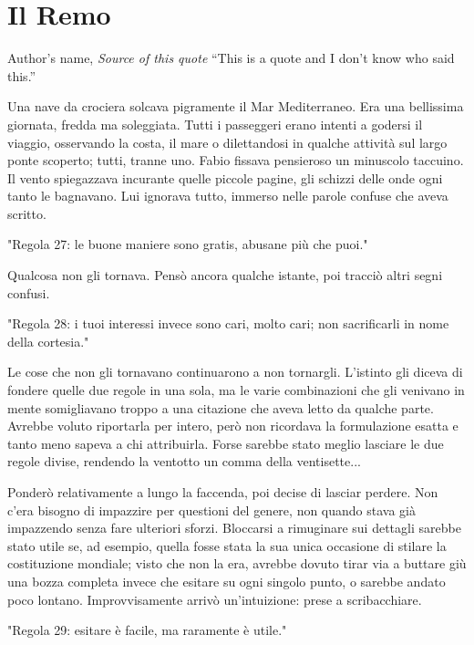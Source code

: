 \chapter{Il Remo}

\begin{chapquote}{Author's name, \textit{Source of this quote}}
``This is a quote and I don't know who said this.''
\end{chapquote}


Una nave da crociera solcava pigramente il Mar Mediterraneo. Era una bellissima giornata, fredda ma soleggiata. Tutti i passeggeri erano intenti a godersi il viaggio, osservando la costa, il mare o dilettandosi in qualche attività sul largo ponte scoperto; tutti, tranne uno. Fabio fissava pensieroso un minuscolo taccuino. Il vento spiegazzava incurante quelle piccole pagine, gli schizzi delle onde ogni tanto le bagnavano. Lui ignorava tutto, immerso nelle parole confuse che aveva scritto.

"Regola 27: le buone maniere sono gratis, abusane più che puoi."

Qualcosa non gli tornava. Pensò ancora qualche istante, poi tracciò altri segni confusi.

"Regola 28: i tuoi interessi invece sono cari, molto cari; non sacrificarli in nome della cortesia."

Le cose che non gli tornavano continuarono a non tornargli. L'istinto gli diceva di fondere quelle due regole in una sola, ma le varie combinazioni che gli venivano in mente somigliavano troppo a una citazione che aveva letto da qualche parte. Avrebbe voluto riportarla per intero, però non ricordava la formulazione esatta e tanto meno sapeva a chi attribuirla. Forse sarebbe stato meglio lasciare le due regole divise, rendendo la ventotto un comma della ventisette...

Ponderò relativamente a lungo la faccenda, poi decise di lasciar perdere. Non c'era bisogno di impazzire per questioni del genere, non quando stava già impazzendo senza fare ulteriori sforzi. Bloccarsi a rimuginare sui dettagli sarebbe stato utile se, ad esempio, quella fosse stata la sua unica occasione di stilare la costituzione mondiale; visto che non la era, avrebbe dovuto tirar via a buttare giù una bozza completa invece che esitare su ogni singolo punto, o sarebbe andato poco lontano. Improvvisamente arrivò un'intuizione: prese a scribacchiare.

"Regola 29: esitare è facile, ma raramente è utile."

